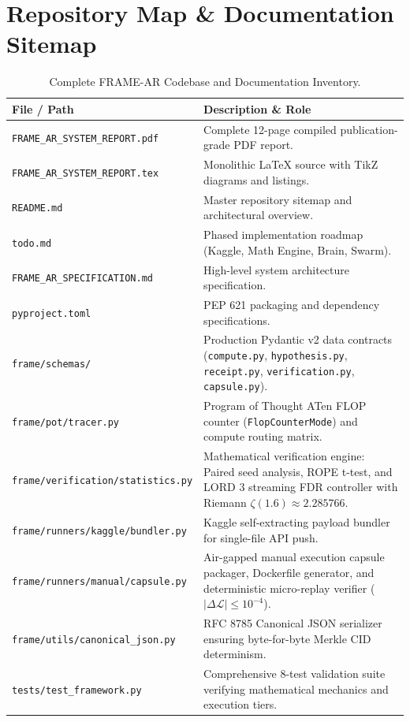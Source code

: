 \documentclass[11pt,a4paper]{article}
\begin{document}
\section{Repository Map \& Documentation Sitemap}

\begin{table}[htbp]
\centering
\footnotesize
\begin{tabular}{@{}lp{10cm}@{}}
\toprule
\textbf{File / Path} & \textbf{Description \& Role} \\
\midrule
\texttt{FRAME\_AR\_SYSTEM\_REPORT.pdf} & Complete 12-page compiled publication-grade PDF report. \\
\texttt{FRAME\_AR\_SYSTEM\_REPORT.tex} & Monolithic LaTeX source with TikZ diagrams and listings. \\
\texttt{README.md} & Master repository sitemap and architectural overview. \\
\texttt{todo.md} & Phased implementation roadmap (Kaggle, Math Engine, Brain, Swarm). \\
\texttt{FRAME\_AR\_SPECIFICATION.md} & High-level system architecture specification. \\
\texttt{pyproject.toml} & PEP 621 packaging and dependency specifications. \\
\texttt{frame/schemas/} & Production Pydantic v2 data contracts (\texttt{compute.py}, \texttt{hypothesis.py}, \texttt{receipt.py}, \texttt{verification.py}, \texttt{capsule.py}). \\
\texttt{frame/pot/tracer.py} & Program of Thought ATen FLOP counter (\texttt{FlopCounterMode}) and compute routing matrix. \\
\texttt{frame/verification/statistics.py} & Mathematical verification engine: Paired seed analysis, ROPE t-test, and LORD 3 streaming FDR controller with Riemann $\zeta(1.6) \approx 2.285766$. \\
\texttt{frame/runners/kaggle/bundler.py} & Kaggle self-extracting payload bundler for single-file API push. \\
\texttt{frame/runners/manual/capsule.py} & Air-gapped manual execution capsule packager, Dockerfile generator, and deterministic micro-replay verifier ($|\Delta\mathcal{L}| \le 10^{-4}$). \\
\texttt{frame/utils/canonical\_json.py} & RFC 8785 Canonical JSON serializer ensuring byte-for-byte Merkle CID determinism. \\
\texttt{tests/test\_framework.py} & Comprehensive 8-test validation suite verifying mathematical mechanics and execution tiers. \\
\bottomrule
\end{tabular}
\caption{Complete FRAME-AR Codebase and Documentation Inventory.}
\label{tab:repo_map}
\end{table}
\end{document}
